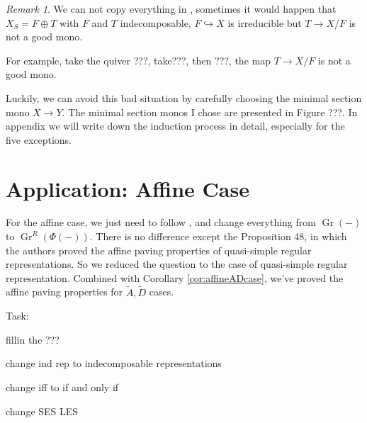 \documentclass[reqno,11pt]{amsart}
\numberwithin{equation}{section}
\theoremstyle{plain}
\theoremstyle{plain}
\numberwithin{equation}{section}
\theoremstyle{remark}
\newtheorem{remark}[theorem]{Remark}
\newcommand{\Gr}{\operatorname{Gr}}
\newcommand{\Grr}{\operatorname{Gr}^{R}}
\begin{document}
\begin{remark}
	We can not copy everything in \cite[Lemma 56]{irelli2019cell}, sometimes it would happen that $X_S=F \oplus T$ with $F$ and $T$ indecomposable, $F \hookrightarrow X$ is irreducible but $T \longrightarrow X/F$ is not a good mono.
	
	For example, take the quiver ???, take???, then ???, the map $T \longrightarrow X/F$ is not a good mono.
	
	Luckily, we can avoid this bad situation by carefully choosing the minimal section mono $X \longrightarrow Y$. The minimal section monos I chose are presented in Figure ???. In appendix we will write down the induction process in detail, especially for the five exceptions.
\end{remark}
\section{Application: Affine Case}
For the affine case, we just need to follow \cite[Section 6]{irelli2019cell}, and change everything from $\Gr(-)$ to $\Grr(\Phi(-))$. There is no difference except the Proposition 48, in which the authors proved the affine paving properties of quasi-simple regular representations. So we reduced the question to the case of quasi-simple regular representation. Combined with Corollary \ref{cor:affineADcase}, we've proved the affine paving properties for $\tilde{A},\tilde{D}$ cases.


Task:


fillin the ???

change ind rep to indecomposable representations

change iff to if and only if

change SES LES



\nocite{irelli2019cell}
\nocite{maksimau2019flag}
\end{document}

